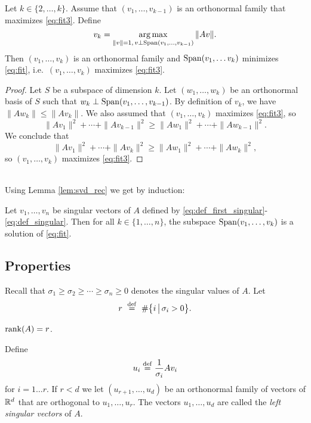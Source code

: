 \documentclass[11pt,nocut]{article}
\begin{document}
\begin{lemma}\label{lem:svd_rec}
	Let $k \in \{2, \dots, k\}$. Assume that $(v_1, \dots, v_{k-1})$ is an orthonormal family that maximizes \eqref{eq:fit3}.
	Define 
	$$
	v_k = \operatorname*{arg\,max}_{\|v\| = 1, \, v \perp {{\rm Span}}(v_1, \dots, v_{k-1})} \|Av\|.
	$$
	Then $(v_1, \dots, v_{k})$ is an orthonormal family and ${{\rm Span}}(v_1, \dots v_k)$ minimizes \eqref{eq:fit}, i.e.\ $(v_1, \dots, v_{k})$ maximizes \eqref{eq:fit3}.
\end{lemma}
\begin{proof}
	Let $S$ be a subspace of dimension $k$. Let $(w_1, \dots, w_k)$ be an orthonormal basis of $S$ such that $w_{k} \perp {{\rm Span}}(v_1, \dots, v_{k-1})$. By definition of $v_k$,
	we have $\|A w_k \| \leq \| A v_k\|$. 
	We also assumed that $(v_1, \dots, v_k)$ maximizes \eqref{eq:fit3}, so
	$$
	\|A v_1\|^2 + \cdots + \| A v_{k-1} \|^2 \geq
	\|A w_1\|^2 + \cdots+ \| A w_{k-1} \|^2.
	$$
	We conclude that
	$$
	\|A v_1\|^2 + \cdots + \| A v_{k} \|^2 \geq
	\|A w_1\|^2 + \cdots + \| A w_{k} \|^2,
	$$
	so $(v_1, \dots, v_k)$ maximizes \eqref{eq:fit3}.
\end{proof}
\\

Using Lemma \ref{lem:svd_rec} we get by induction:
\begin{proposition}
	Let $v_1, \dots, v_n$ be singular vectors of $A$ defined by \eqref{eq:def_first_singular}-\eqref{eq:def_singular}. Then for all $k \in \{1, \dots, n\}$, the subspace ${{\rm Span}}(v_1, \dots, v_k)$ is a solution of \eqref{eq:fit}.
\end{proposition}


\subsection{Properties}

Recall that $\sigma_1 \geq \sigma_2 \geq \cdots \geq \sigma_n \geq 0$ denotes the singular values of $A$. Let
$$
r \ \overset{\rm def}{=} \
	\# \big\{ i \, \big| \, \sigma_i > 0\big\}.
$$

\begin{proposition}
	${{\rm rank}}(A) = r$.
\end{proposition}

\begin{definition}
	Define
	$$
	u_i \overset{\rm def}{=} \frac{1}{\sigma_i} A v_i
	$$
	for $i = 1 \dots r$. If $r<d$ we let $(u_{r+1}, \dots, u_d)$ be an orthonormal family of vectors of $\mathbb{R}^d$ that are orthogonal to $u_1, \dots, u_r$.
	The vectors $u_1, \dots, u_d$ are called the \emph{left singular vectors} of $A$.
\end{definition}
\end{document}
